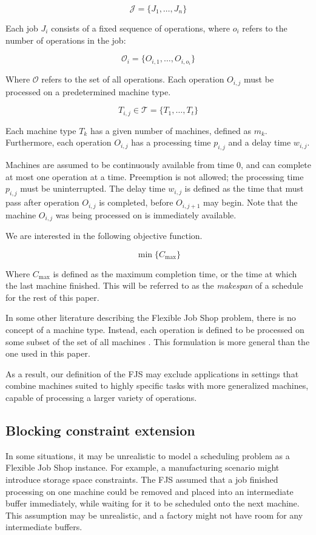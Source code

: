 \documentclass[a4paper,10pt]{article}
\begin{document}
\[ \mathcal{J} = \{J_1, \dots, J_n\} \]

Each job $J_i$ consists of a fixed sequence of operations, where $o_i$ refers to the number of operations in the job:

\[ \mathcal{O}_i = \{O_{i,1}, \dots, O_{i, o_i}\} \]

Where $\mathcal{O}$ refers to the set of all operations. Each operation $O_{i,j}$ must be processed on a predetermined machine type.

\[ T_{i,j} \in \mathcal{T} = \{T_1, \dots, T_t\} \]

Each machine type $T_k$ has a given number of machines, defined as $m_k$. Furthermore, each operation $O_{i,j}$ has a processing time $p_{i,j}$ and a delay time $w_{i,j}$.

Machines are assumed to be continuously available from time 0, and can complete at most one operation at a time. Preemption is not allowed; the processing time $p_{i,j}$ must be uninterrupted. The delay time $w_{i,j}$ is defined as the time that must pass after operation $O_{i,j}$ is completed, before $O_{i,j + 1}$ may begin. Note that the machine $O_{i,j}$ was being processed on is immediately available.

We are interested in the following objective function.

\[ \min \{ C_\text{max} \} \]

Where $C_\text{max}$ is defined as the maximum completion time, or the time at which the last machine finished. This will be referred to as the \emph{makespan} of a schedule for the rest of this paper.

In some other literature describing the Flexible Job Shop problem, there is no concept of a machine type. Instead, each operation is defined to be processed on some subset of the set of all machines \cite{approxfjsp}. This formulation is more general than the one used in this paper.

As a result, our definition of the FJS may exclude applications in settings that combine machines suited to highly specific tasks with more generalized machines, capable of processing a larger variety of operations.

\subsection{Blocking constraint extension}

In some situations, it may be unrealistic to model a scheduling problem as a Flexible Job Shop instance. For example, a manufacturing scenario might introduce storage space constraints. The FJS assumed that a job finished processing on one machine could be removed and placed into an intermediate buffer immediately, while waiting for it to be scheduled onto the next machine. This assumption may be unrealistic, and a factory might not have room for any intermediate buffers.
\end{document}
